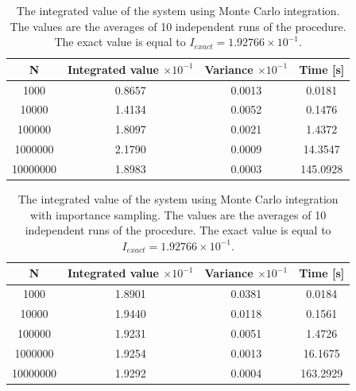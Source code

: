 \documentclass[%
reprint,
amsmath,amssymb,
aps,
]{revtex4-1}
\begin{document}
\begin{table}[!h]
	\begin{tabular}{|c|c|c|c|}
		\hline 
		\hspace{5mm} \textbf{N} \hspace{5mm} & \textbf{Integrated value} $\times 10^{-1}$& \hspace{3mm} \textbf{Variance} $\times 10^{-1}$ & \hspace{3mm} \textbf{Time  [s]} \hspace{5mm}\\
		\hline 
			1000 & 0.8657  & 0.0013  & 0.0181 \\
			10000 & 1.4134  & 0.0052  & 0.1476 \\
			100000 & 1.8097  & 0.0021  & 1.4372 \\
			1000000 & 2.1790  & 0.0009  & 14.3547 \\
			10000000 & 1.8983  & 0.0003  & 145.0928 \\
		\hline 
	\end{tabular}
	\caption{\label{mc_values} \centering The integrated value of the system using Monte Carlo integration. The values are the averages of 10 independent runs of the procedure. The exact value is equal to $I_{exact} = 1.92766 \times 10^{-1}$.}
\end{table}


\begin{table}[!h]
	\begin{tabular}{|c|c|c|c|}
		\hline 
		\hspace{5mm} \textbf{N} \hspace{5mm} & \textbf{Integrated value} $\times 10^{-1}$& \hspace{3mm} \textbf{Variance}  $\times 10^{-1}$& \hspace{3mm} \textbf{Time  [s]} \hspace{5mm}\\
		\hline 
			1000 & 1.8901  & 0.0381  & 0.0184 \\
			10000 & 1.9440  & 0.0118  & 0.1561 \\
			100000 & 1.9231  & 0.0051  & 1.4726 \\
			1000000 & 1.9254  & 0.0013  & 16.1675 \\
			10000000 & 1.9292  & 0.0004  & 163.2929 \\

		\hline 
	\end{tabular}
	\caption{\label{mc_values_is} \centering The integrated value of the system using Monte Carlo integration with importance sampling. The values are the averages of 10 independent runs of the procedure. The exact value is equal to $I_{exact} = 1.92766 \times 10^{-1}$.}
\end{table}
\end{document}
